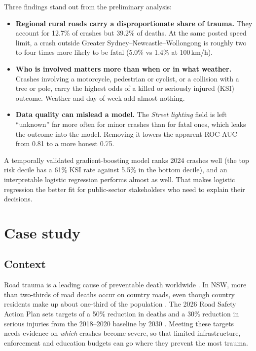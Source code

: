 \documentclass[11pt,a4paper]{article}
\begin{document}
Three findings stand out from the preliminary analysis:
\begin{itemize}
  \item \textbf{Regional rural roads carry a disproportionate share of trauma.} They account for 12.7\% of
        crashes but 39.2\% of deaths. At the same posted speed limit, a crash outside Greater
        Sydney--Newcastle--Wollongong is roughly two to four times more likely to be fatal (5.0\% vs 1.4\% at 100\,km/h).
  \item \textbf{Who is involved matters more than when or in what weather.} Crashes involving a motorcycle,
        pedestrian or cyclist, or a collision with a tree or pole, carry the highest odds of a killed or
        seriously injured (KSI) outcome. Weather and day of week add almost nothing.
  \item \textbf{Data quality can mislead a model.} The \emph{Street lighting} field is left
        \enquote{unknown} far more often for minor crashes than for fatal ones, which leaks the outcome into the
        model. Removing it lowers the apparent ROC-AUC from 0.81 to a more honest 0.75.
\end{itemize}

A temporally validated gradient-boosting model ranks 2024 crashes well (the top risk decile has a 61\% KSI
rate against 5.5\% in the bottom decile), and an interpretable logistic regression performs almost as well.
That makes logistic regression the better fit for public-sector stakeholders who need to explain their
decisions.

\tableofcontents
\newpage

\section{Case study}
\label{sec:case}

\subsection{Context}
Road trauma is a leading cause of preventable death worldwide \parencite{who_2023}. In NSW, more than two-thirds
of road deaths occur on country roads, even though country residents make up about one-third of the
population \parencite{tfnsw_actionplan}. The 2026 Road Safety Action Plan sets targets of a 50\% reduction in
deaths and a 30\% reduction in serious injuries from the 2018--2020 baseline by 2030 \parencite{tfnsw_actionplan}.
Meeting these targets needs evidence on \emph{which} crashes become severe, so that limited
infrastructure, enforcement and education budgets can go where they prevent the most trauma.
\end{document}
